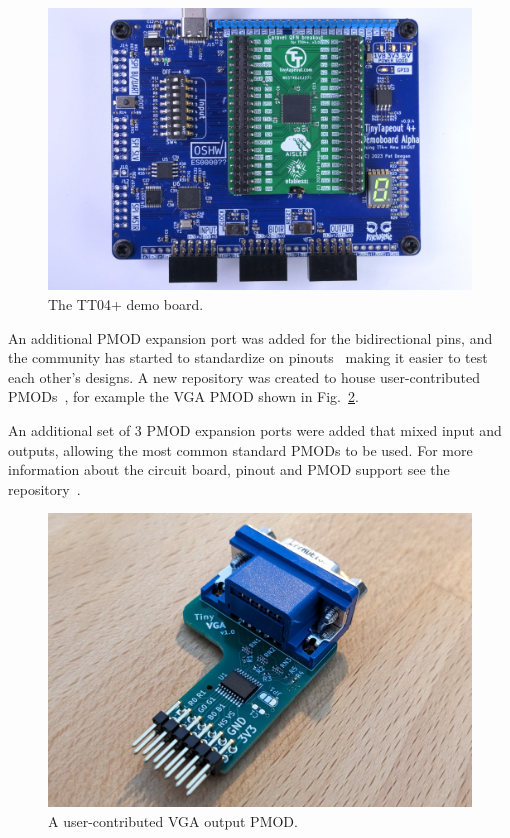 \begin{figure}[!t]
\centering
\includegraphics[width=\columnwidth]{./Figs/tt04-demoboard-top.jpg}
\caption{The TT04+ demo board\cite{tt04demoboard}.}
\label{fig:TT04plus_demo_board}
\end{figure}

An additional PMOD expansion port was added for the bidirectional pins, and the community has started to standardize on pinouts~\cite{pinouts} making it easier to test each other's designs.
A new repository was created to house user-contributed PMODs~\cite{awesomepmods}, for example the VGA PMOD shown in Fig.~\ref{fig:user_contributed_VGA_PMOD}.

An additional set of 3 PMOD expansion ports were added that mixed input and outputs, allowing the most common standard PMODs to be used. For more information about the circuit board, pinout and PMOD support see the repository~\cite{tt04demoboard}.

\begin{figure}[!t]
\centering
\includegraphics[width=\columnwidth]{./Figs/tiny_vga_pmod.jpg}
\caption{A user-contributed VGA output PMOD.}
\label{fig:user_contributed_VGA_PMOD}
\end{figure}


